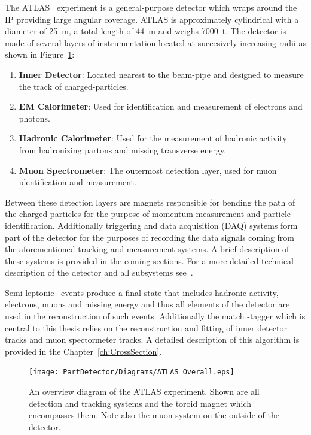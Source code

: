 The ATLAS~\cite{Detector:ATLASExperimentGeneral} experiment is a general-purpose detector which wraps around the IP providing large angular coverage. ATLAS is approximately cylindrical with a diameter of \SI{25}{\meter}, a total length of \SI{44}{\meter} and weighs \SI{7000}{\tonne}. The detector is made of several layers of instrumentation located at succesively increasing radii as shown in Figure~\ref{fig:ATLASOverviewFigure}:

\begin{enumerate}
  \item \textbf{Inner Detector}: Located nearest to the beam-pipe and designed to measure the track of charged-particles.
  \item \textbf{EM Calorimeter}: Used for identification and measurement of electrons and photons.
  \item \textbf{Hadronic Calorimeter}: Used for the measurement of hadronic activity from hadronizing partons and missing transverse energy.
  \item \textbf{Muon Spectrometer}: The outermost detection layer, used for muon identification and measurement.
\end{enumerate}

Between these detection layers are magnets responsible for bending the path of the charged particles for the purpose of momentum measurement and particle identification. Additionally triggering and data acquisition (DAQ) systems form part of the detector for the purposes of recording the data signals coming from the aforementioned tracking and measurement systems. A brief description of these systems is provided in the coming sections. For a more detailed technical description of the detector and all subsystems see~\cite{Detector:ATLAS_TDR_vol1}.

Semi-leptonic \ttbar\ events produce a final state that includes hadronic activity, electrons, muons and missing energy and thus all elements of the detector are used in the reconstruction of such events. Additionally the match \xsm-tagger which is central to this thesis relies on the reconstruction and fitting of inner detector tracks and muon spectormeter tracks. A detailed description of this algorithm is provided in the Chapter~\ref{ch:CrossSection}. 

\begin{figure}[htbp]
  \centering
  \texttt{[image: PartDetector/Diagrams/ATLAS\_Overall.eps]}
  \caption{An overview diagram of the ATLAS experiment. Shown are all detection and tracking systems and the toroid magnet which encompasses them. Note also the muon system on the outside of the detector.}
  \label{fig:ATLASOverviewFigure}
\end{figure}

